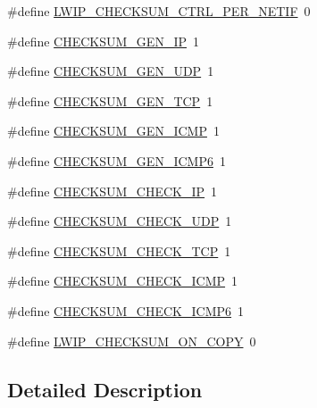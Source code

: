 \begin{DoxyCompactItemize}
\#define \hyperlink{group__lwip__opts__checksum_ga3ecc5246a0c6ca5aed56c2d7899c1004}{L\+W\+I\+P\+\_\+\+C\+H\+E\+C\+K\+S\+U\+M\+\_\+\+C\+T\+R\+L\+\_\+\+P\+E\+R\+\_\+\+N\+E\+T\+IF}~0
\item 
\#define \hyperlink{group__lwip__opts__checksum_ga8ddad81fc26268a13b35091781da2265}{C\+H\+E\+C\+K\+S\+U\+M\+\_\+\+G\+E\+N\+\_\+\+IP}~1
\item 
\#define \hyperlink{group__lwip__opts__checksum_ga98d460f8c2baed8bf62d5473831c0b2c}{C\+H\+E\+C\+K\+S\+U\+M\+\_\+\+G\+E\+N\+\_\+\+U\+DP}~1
\item 
\#define \hyperlink{group__lwip__opts__checksum_ga800069963cc4552b99235237c22f00bb}{C\+H\+E\+C\+K\+S\+U\+M\+\_\+\+G\+E\+N\+\_\+\+T\+CP}~1
\item 
\#define \hyperlink{group__lwip__opts__checksum_ga2291ec5bec0a551545da6d5f9f9316b2}{C\+H\+E\+C\+K\+S\+U\+M\+\_\+\+G\+E\+N\+\_\+\+I\+C\+MP}~1
\item 
\#define \hyperlink{group__lwip__opts__checksum_ga7cd47a55af03b1048c5a4a5fe0e76013}{C\+H\+E\+C\+K\+S\+U\+M\+\_\+\+G\+E\+N\+\_\+\+I\+C\+M\+P6}~1
\item 
\#define \hyperlink{group__lwip__opts__checksum_ga005b1b9988b84a2cb844144cef22c11e}{C\+H\+E\+C\+K\+S\+U\+M\+\_\+\+C\+H\+E\+C\+K\+\_\+\+IP}~1
\item 
\#define \hyperlink{group__lwip__opts__checksum_ga6747f7b72abe544fd4dc184cc7fcad37}{C\+H\+E\+C\+K\+S\+U\+M\+\_\+\+C\+H\+E\+C\+K\+\_\+\+U\+DP}~1
\item 
\#define \hyperlink{group__lwip__opts__checksum_gab676cc29571b7ffda12336482ad97699}{C\+H\+E\+C\+K\+S\+U\+M\+\_\+\+C\+H\+E\+C\+K\+\_\+\+T\+CP}~1
\item 
\#define \hyperlink{group__lwip__opts__checksum_ga79807171be8c20b69a5cd8de83566d25}{C\+H\+E\+C\+K\+S\+U\+M\+\_\+\+C\+H\+E\+C\+K\+\_\+\+I\+C\+MP}~1
\item 
\#define \hyperlink{group__lwip__opts__checksum_gaf466a10b093489910a773fd1cec74c2d}{C\+H\+E\+C\+K\+S\+U\+M\+\_\+\+C\+H\+E\+C\+K\+\_\+\+I\+C\+M\+P6}~1
\item 
\#define \hyperlink{group__lwip__opts__checksum_ga9f60183f0442bdbeefd6b395c6647613}{L\+W\+I\+P\+\_\+\+C\+H\+E\+C\+K\+S\+U\+M\+\_\+\+O\+N\+\_\+\+C\+O\+PY}~0
\end{DoxyCompactItemize}


\subsection{Detailed Description}


